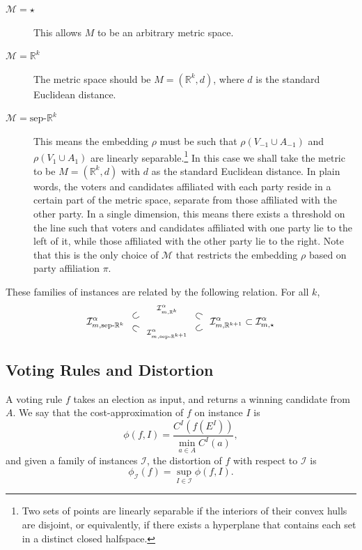 \documentclass[letterpaper]{article} %
\theoremstyle{definition}
\newcommand{\upsubset}{\mathbin{\rotatebox[origin=c]{30}{$\subset$}}}
\newcommand{\downsubset}{\mathbin{\rotatebox[origin=c]{-30}{$\subset$}}}
\newcommand{\bbR}{\mathbb{R}}
\newcommand{\calI}{\mathcal{I}}
\newcommand{\calM}{\mathcal{M}}
\newcommand{\pleft}{-1}
\newcommand{\pright}{1}
\newcommand{\all}{\star}
\newcommand{\sep}{\textrm{sep-}}
\newcommand{\euc}[1]{\bbR^{#1}}
\newcommand{\eucsep}[1]{\sep\euc{#1}}
\newcommand{\I}{\calI}
\begin{document}
\begin{description}
	\item[$\calM=\star$] This allows $M$ to be an arbitrary metric space. 
	\item[$\calM = \bbR^k$] The metric space should be $M = (\bbR^k,d)$, where $d$ is the standard Euclidean distance.
	\item [$\calM = \textrm{sep-}\bbR^k$] This means the embedding $\rho$ must be such that $\rho(V_{\pleft} \cup A_{\pleft})$ and $\rho(V_{\pright} \cup A_{\pright})$ are linearly separable.\footnote{Two sets of points are linearly separable if the interiors of their convex hulls are disjoint, or equivalently, if there exists a hyperplane that contains each set in a distinct closed halfspace.} In this case we shall take the metric to be $M = (\bbR^k,d)$ with $d$ as the standard Euclidean distance. In plain words, the voters and candidates affiliated with each party reside in a certain part of the metric space, separate from those affiliated with the other party. In a single dimension, this means there exists a threshold on the line such that voters and candidates affiliated with one party lie to the left of it, while those affiliated with the other party lie to the right. %
	Note that this is the only choice of $\calM$ that restricts the embedding $\rho$ based on party affiliation $\pi$. 
\end{description}

These families of instances are related by the following relation. For all $k$, 
$$
\I^{\alpha}_{m,\eucsep{k}} \ \ 
\substack{\upsubset \\[0.1cm] \downsubset} \ \ 
\substack{\I^{\alpha}_{m,\euc{k}} \\[0.5cm] \I^{\alpha}_{m,\eucsep{k+1}}} \ \ 
\substack{\downsubset \\[0.1cm] \upsubset} \ \ 
\I^{\alpha}_{m,\euc{k+1}} \subset \I^{\alpha}_{m,\all}
$$

\subsection{Voting Rules and Distortion}

A voting rule $f$ takes an election as input, and returns a winning candidate from $A$. We say that the cost-approximation of $f$ on instance $I$ is 
$$
\phi(f,I) = \frac{C^I(f(E^I))}{\min_{a \in A} C^I(a)},
$$
and given a family of instances $\calI$, the distortion of $f$ with respect to $\calI$ is
$$
\phi_{\calI}(f) = \sup_{I \in \calI} \phi(f,I).
$$
\end{document}
